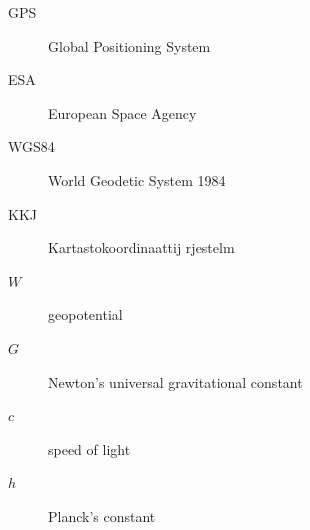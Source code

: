 \documentclass{article}
\begin{document}
\begin{abstract}[swedish]\lipsum[7-9]\end{abstract}


\begin{preface}
\lipsum[1-4]
\end{preface}





\listofpublications





\abbreviations

\begin{description}
\item[GPS] Global Positioning System
\item[ESA] European Space Agency
\item[WGS84] World Geodetic System 1984
\item[KKJ] Kartastokoordinaattij rjestelm 
\end{description}

\symbols

\begin{description}
\item[$W$] geopotential
\item[$G$] Newton's universal gravitational constant
\item[$c$] speed of light
\item[$h$] Planck's constant
\end{description}


\end{document}
